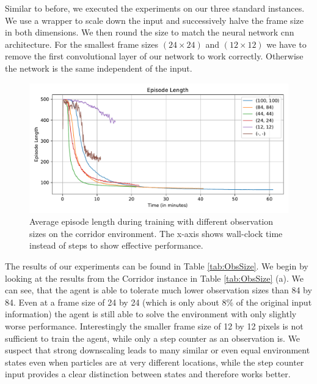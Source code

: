 Similar to before, we executed the experiments on our three standard instances. We use a wrapper to scale down the input and successively halve the frame size in both dimensions. We then round the size to match the neural network cnn architecture. For the smallest frame sizes $(24 \times 24)$ and $(12 \times 12)$ we have to remove the first convolutional layer of our network to work correctly. Otherwise the network is the same independent of the input.

\begin{figure}[htp]
    \begin{center}
        \includegraphics[clip, width=0.95\columnwidth]{figures/evaluation/observations/maze0318_ep_len_time.pdf}
    \end{center}
    \caption[Episode Length on the Corridor Environment using Different Observation Sizes]{Average episode length during training with different observation sizes on the corridor environment. The x-axis shows wall-clock time instead of steps to show effective performance.} \label{fig:ObsSize/Maze0318/EpLen}
\end{figure}


The results of our experiments can be found in Table \ref{tab:ObsSize}. We begin by looking at the results from the Corridor instance in Table \ref{tab:ObsSize} (a). We can see, that the agent is able to tolerate much lower observation sizes than 84 by 84. Even at a frame size of 24 by 24 (which is only about 8\% of the original input information) the agent is still able to solve the environment with only slightly worse performance. Interestingly the smaller frame size of 12 by 12 pixels is not sufficient to train the agent, while only a step counter as an observation is. We suspect that strong downscaling leads to many similar or even equal environment states even when particles are at very different locations, while the step counter input provides a clear distinction between states and therefore works better.

